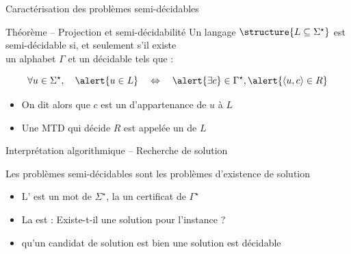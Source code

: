 
\begingroup

\begin{frame}{Caractérisation des problèmes semi-décidables}

  \vspace{-2mm}
  \begin{block}{Théorème -- Projection et semi-décidabilité}
    Un langage $\structure{L \subseteq \Sigma^\star}$ est \alert{semi-décidable}
    si, et seulement s'il existe\\
    un alphabet $\Gamma$ et un  \alert{décidable}
    tels que :

    \vspace{-2mm}
    $$
    \forall u \in \Sigma^\star,
    \quad
    \alert{u\in L}
    \quad \Leftrightarrow \quad
    \alert{\exists c} \in \Gamma^\star, \alert{\langle u,c \rangle \in R}
    $$

    \vspace{-2mm}
    \begin{itemize}
    \item On dit alors que $c$ est un  d'appartenance de $u$ à $L$ 
    \item Une MTD qui décide $R$ est appelée un  de $L$
    \end{itemize}
  \end{block}

  \vspace{-1mm}
  \begin{block}{Interprétation algorithmique -- Recherche de solution}

    Les problèmes \alert{semi-décidables} sont les problèmes d'existence de solution

    \begin{itemize}
    \item L' est un mot de $\Sigma^\star$, la  un certificat de $\Gamma^\star$
    \item La  est : \alert{\og Existe-t-il une solution pour l'instance ? \fg}
    \item {} qu'un candidat de solution est bien une solution est \alert{décidable}
    \end{itemize}


\end{block}
\end{frame}
